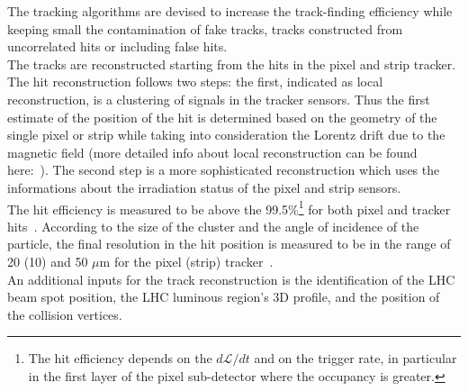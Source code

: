 The tracking algorithms are devised to
increase the track-finding efficiency while keeping small the
contamination of fake tracks, \ie tracks constructed from uncorrelated hits or
including false hits.\\
 The tracks are reconstructed starting from the hits in the pixel and
strip tracker. The hit reconstruction follows two steps: the first,
indicated as local reconstruction, is a clustering of signals in the
tracker sensors. Thus 
the first estimate of the
position of the hit is determined based on the geometry of the single
pixel or strip while taking into consideration the Lorentz drift due
to the magnetic field (more detailed info about local reconstruction
can be found here:~\cite{CMS:particleflow}). The second step is a more
sophisticated reconstruction which uses the informations about the
irradiation status of the pixel and strip sensors. \\
The hit efficiency is measured to be above the 99.5\%\footnote{The hit
  efficiency depends on the
$d\mathcal{L}/dt$ and on the trigger rate, in particular in
the first layer of the pixel sub-detector where the occupancy is greater.} for both pixel
and tracker hits~\cite{CMS:particleflow}. According to the size of the
cluster and the angle of
incidence of the particle, the final resolution in the
hit position is measured to be in the range of 20 (10) and 50 $\mu$m
for the pixel (strip) tracker~\cite{CMS:particleflow}.\\
An additional inputs for the track reconstruction is the identification
of the LHC beam spot position, \ie the LHC luminous region's
3D profile, and the position of the collision
vertices. \\

